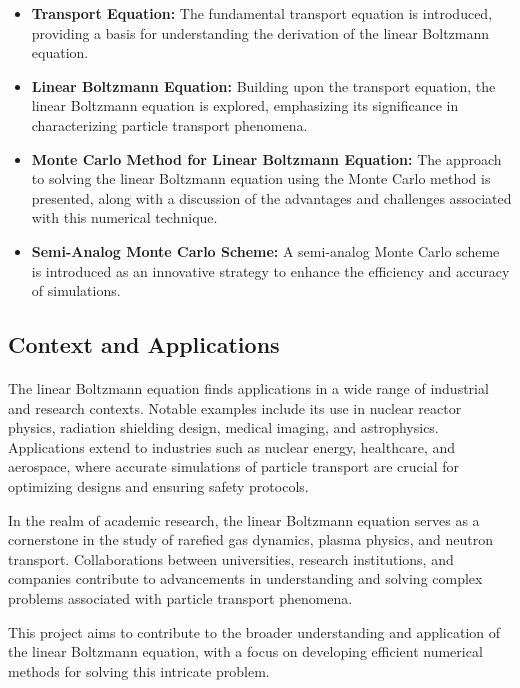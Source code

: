 \documentclass[a4paper, 11pt]{article}
\begin{document}
\begin{itemize}
	\item \textbf{Transport Equation:} The fundamental transport equation is introduced, providing a basis for understanding the derivation of the linear Boltzmann equation.
	
	\item \textbf{Linear Boltzmann Equation:} Building upon the transport equation, the linear Boltzmann equation is explored, emphasizing its significance in characterizing particle transport phenomena.
	
	\item \textbf{Monte Carlo Method for Linear Boltzmann Equation:} The approach to solving the linear Boltzmann equation using the Monte Carlo method is presented, along with a discussion of the advantages and challenges associated with this numerical technique.
	
	\item \textbf{Semi-Analog Monte Carlo Scheme:} A semi-analog Monte Carlo scheme is introduced as an innovative strategy to enhance the efficiency and accuracy of simulations.
\end{itemize}

\subsection{Context and Applications}

\paragraph{}
The linear Boltzmann equation finds applications in a wide range of industrial and research contexts. Notable examples include its use in nuclear reactor physics, radiation shielding design, medical imaging, and astrophysics. Applications extend to industries such as nuclear energy, healthcare, and aerospace, where accurate simulations of particle transport are crucial for optimizing designs and ensuring safety protocols.

In the realm of academic research, the linear Boltzmann equation serves as a cornerstone in the study of rarefied gas dynamics, plasma physics, and neutron transport. Collaborations between universities, research institutions, and companies contribute to advancements in understanding and solving complex problems associated with particle transport phenomena.


\medbreak

This project aims to contribute to the broader understanding and application of the linear Boltzmann equation, with a focus on developing efficient numerical methods for solving this intricate problem.
\end{document}
